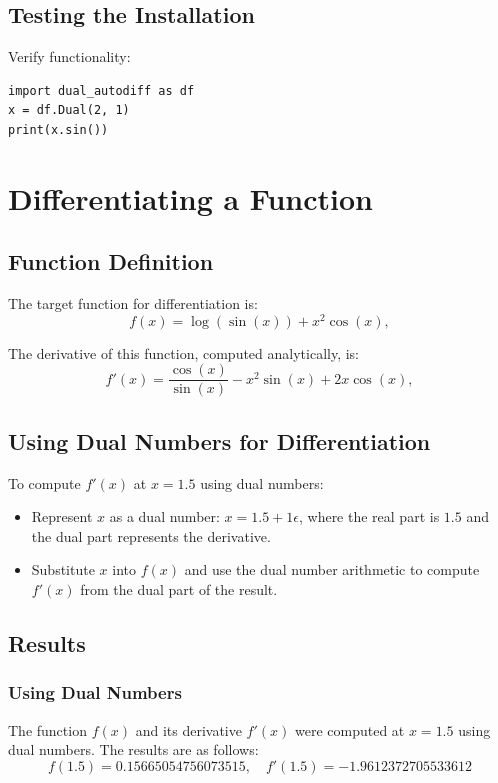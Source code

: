 \documentclass[a4paper,12pt]{article}
\begin{document}
\subsection{Testing the Installation}
Verify functionality:
\begin{verbatim}
import dual_autodiff as df
x = df.Dual(2, 1)
print(x.sin())
\end{verbatim}



\section{Differentiating a Function}

\subsection{Function Definition}
The target function for differentiation is:
\begin{equation}
    f(x) = \log(\sin(x)) + x^2 \cos(x),
    \label{eq:function_definition}
    \end{equation}
    
The derivative of this function, computed analytically, is:
\begin{equation}
    f'(x) = \frac{\cos(x)}{\sin(x)} -x^2 \sin(x) + 2x \cos(x),
    \label{eq:function_derivative}
    \end{equation}
    

\subsection{Using Dual Numbers for Differentiation}
To compute \(f'(x)\) at \(x = 1.5\) using dual numbers:
\begin{itemize}
    \item Represent \(x\) as a dual number: \(x = 1.5 + 1\epsilon\), where the real part is \(1.5\) and the dual part represents the derivative.
    \item Substitute \(x\) into \(f(x)\) and use the dual number arithmetic to compute \(f'(x)\) from the dual part of the result.
\end{itemize}

\subsection{Results}

\subsubsection{Using Dual Numbers}
The function \(f(x)\) and its derivative \(f'(x)\) were computed at \(x = 1.5\) using dual numbers. The results are as follows:
\[
f(1.5) = 0.15665054756073515, \quad f'(1.5) = -1.9612372705533612
\]
\end{document}
